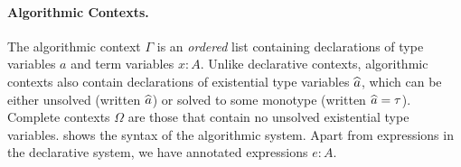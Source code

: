 \paragraph{Algorithmic Contexts.}

The algorithmic context $\Gamma$ is an
\textit{ordered} list containing declarations of type variables $a$ and term
variables $x : A$. Unlike declarative contexts, algorithmic contexts also
contain declarations of existential type variables $\widehat{a}$, which can be either
unsolved (written $\widehat{a}$) or solved to some monotype (written $\widehat{a} = \tau$).
Complete contexts $\Omega$ are those that contain no unsolved existential type
variables.  shows the syntax of the algorithmic system.
Apart from expressions in the declarative system, we have annotated expressions
$e : A$.




